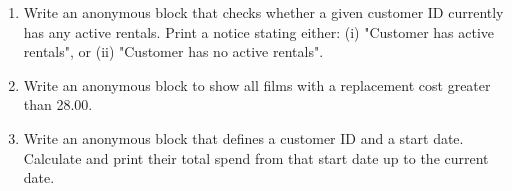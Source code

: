 \documentclass[12pt,a4paper]{article}
\newif\ifshowsolutions
\begin{document}
\begin{enumerate}
\begin{lstlisting}[language=SQL]
DO $$
BEGIN
    CALL update_customer_email(1, 'new.email@example.com');
END;
$$;
\end{lstlisting}
\fi


\item Write an anonymous block that checks whether a given customer ID currently has any active rentals. Print a notice stating either:
(i) "Customer has active rentals", or
(ii) "Customer has no active rentals".

\ifshowsolutions
\begin{lstlisting}[language=SQL]
DO $$
DECLARE
    v_customer_id INT := 155;
    v_count INT;
BEGIN
    SELECT COUNT(*)
    INTO v_count
    FROM rental
    WHERE customer_id = v_customer_id
      AND return_date IS NULL;

    IF v_count > 0 THEN
        RAISE NOTICE 'Customer % has active rentals', v_customer_id;
    ELSE
        RAISE NOTICE 'Customer % has no active rentals', v_customer_id;
    END IF;
END $$;
\end{lstlisting}
\fi
\item Write an anonymous block to show all films with a replacement cost greater than 28.00.
\ifshowsolutions
\begin{lstlisting}[language=SQL]
DO $$
DECLARE
    film_record RECORD;
BEGIN
    FOR film_record IN 
        SELECT title, replacement_cost 
        FROM film 
        WHERE replacement_cost > 28.00
    LOOP
        RAISE NOTICE 'Film: %, Cost: $%', film_record.title, film_record.replacement_cost;
    END LOOP;
END;
$$ LANGUAGE plpgsql;
\end{lstlisting}
\fi
\item Write an anonymous block that defines a customer ID and a start date. Calculate and print their total spend from that start date up to the current date.


\end{enumerate}
\end{document}
